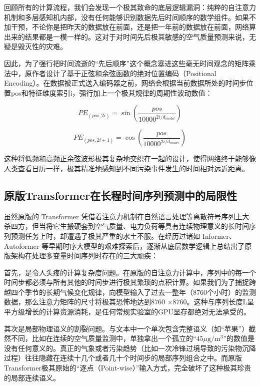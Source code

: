 \begin{enumerate}[label=（\arabic*）, leftmargin=0pt, itemindent=4.5em, labelsep=0.5em, listparindent=2em, parsep=0pt]
    回顾所有的计算流程，我们会发现一个极其致命的底层逻辑漏洞：纯粹的自注意力机制和多层感知机内部，没有任何能够识别数据先后时间顺序的数学组件。如果不加干预，不论你是把昨天的数据放在前面，还是把一年前的数据放在前面，网络算出来的结果都是一模一样的。这对于对时间先后极其敏感的空气质量预测来说，无疑是毁灭性的灾难。

    因此，为了强行把时间流逝的“先后顺序”这个概念塞进这些毫无时间观念的矩阵乘法中，原作者设计了基于正弦和余弦函数的绝对位置编码（Positional Encoding）。在数据被正式送入编码器之前，网络会根据当前数据所处的时间步位置pos和特征维度索引i，强行加上一个极其规律的周期性波动数值：

    \begin{equation}\label{eq:Positional_Encoding_Sin}
        PE_{(pos, 2i)} = \sin\left(\frac{pos}{10000^{2i/d_{model}}}\right)
    \end{equation}

    \begin{equation}\label{eq:Positional_Encoding_Cos}
        PE_{(pos, 2i+1)} = \cos\left(\frac{pos}{10000^{2i/d_{model}}}\right)
    \end{equation}

    这种将低频和高频正余弦波形极其复杂地交织在一起的设计，使得网络终于能够像人类查看日历一样，极其精准地感知到不同污染事件发生的时间相对远近距离。

\end{enumerate}

\subsection{原版Transformer在长程时间序列预测中的局限性}

虽然原版的 Transformer 凭借着注意力机制在自然语言处理等离散符号序列上大杀四方，但当将它生搬硬套到空气质量、电力负荷等具有连续物理意义的长时间序列预测任务上时，却遭遇了极其严重的水土不服。在经历过诸如 Informer\cite{zhou_informer_2021}、Autoformer\cite{wu_autoformer_2021} 等早期时序大模型的艰难探索后，逐渐从底层数学逻辑上总结出了原版架构在处理多变量时间序列时存在的三大顽疾：

首先，是令人头疼的计算复杂度问题。在原版的自注意力计算中，序列中的每一个时间步都必须与所有其他的时间步进行极其繁琐的点积计算。如果我们为了捕捉跨越四个季节的长期气候变化规律，向模型输入了过去一整年（8760个小时）的监测数据，那么注意力矩阵的尺寸将极其恐怖地达到8760 ×8760。这种与序列长度L呈平方级增长的计算资源消耗，是任何常规实验室的GPU显存都绝对无法承受的。

其次是局部物理语义的割裂问题。与文本中一个单次包含完整语义（如“苹果”）截然不同，比如在连续的空气质量监测中，单独拿出一个孤立的“$45 \mu\mathrm{g}/\mathrm{m}^{3}$”的数值是没有任何意义的。真正的气象或者污染趋势（比如一次冷锋过境导致的污染物沉降过程）往往隐藏在连续十几个或者几十个时间步的局部序列组合之中。而原版Transformer极其原始的“逐点（Point-wise）”输入方式，完全破坏了这种极其珍贵的局部连续语义。

